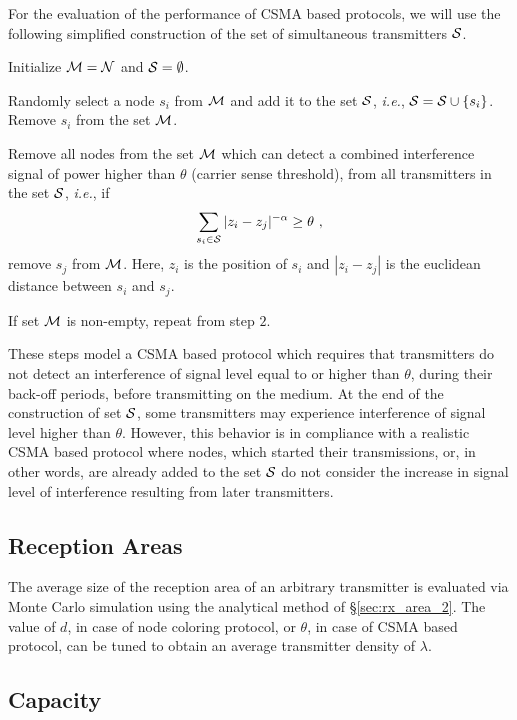 \documentclass[12pt,english]{article}
\begin{document}
For the evaluation of the performance of CSMA based protocols, we will use the following simplified construction of the set of simultaneous transmitters ${\cal S}$. 
\begin{compactenum}
\item Initialize ${\cal M}={\cal N}$ and ${\cal S}=\emptyset$.
\item Randomly select a node $s_{i}$ from ${\cal M}$ and add it to the set ${\cal S}$, {\it i.e.}, ${\cal S}={\cal S}\cup\{s_{i}\}$. Remove $s_{i}$ from the set ${\cal M}$.
\item Remove all nodes from the set ${\cal M}$ which can detect a combined interference signal of power higher than $\theta$ (carrier sense threshold), from all transmitters in the set ${\cal S}$, {\it i.e.}, if 
$$
\sum_{s_i\in\cal{S}}|z_i-z_j|^{-\alpha}\geq \theta~, 
$$ 
remove $s_j$ from $\cal{M}$. Here, $z_i$ is the position of $s_i$ and $|z_i-z_j|$ is the euclidean distance between $s_i$ and $s_j$.
\item If set ${\cal M}$ is non-empty, repeat from step $2$.
\end{compactenum}
These steps model a CSMA based protocol which requires that transmitters do not detect an interference of signal level equal to or higher than $\theta$, during their back-off periods, before transmitting on the medium. At the end of the construction of set ${\cal S}$, some transmitters may experience interference of signal level higher than $\theta$. However, this behavior is in compliance with a realistic CSMA based protocol where nodes, which started their transmissions, or, in other words, are already added to the set ${\cal S}$ do not consider the increase in signal level of interference resulting from later transmitters.

\subsection{Reception Areas} 

The average size of the reception area of an arbitrary transmitter is evaluated via Monte Carlo simulation using the analytical method of \S \ref{sec:rx_area_2}. The value of $d$, in case of node coloring protocol, or $\theta$, in case of CSMA based protocol, can be tuned to obtain an average transmitter density of $\lambda$. 

\subsection{Capacity}
\end{document}
